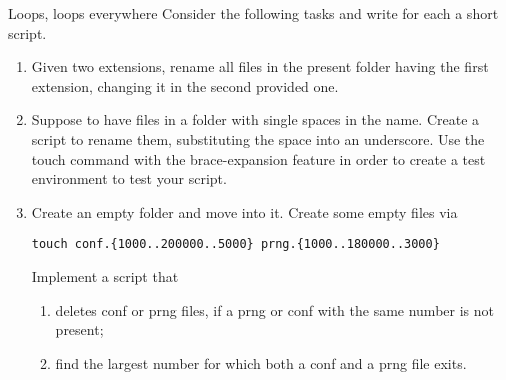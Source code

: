 
\begin{exercise}[Instructive]{Loops, loops everywhere}
    Consider the following tasks and write for each a short script.
    \begin{enumerate}[after=\vspace{-0.6\baselineskip}]
        \item Given two extensions, rename all files in the present folder having the first extension, changing it in the second provided one.
        \item Suppose to have files in a folder with single spaces in the name. Create a script to rename them, substituting the space into an underscore.
              Use the touch command with the brace-expansion feature in order to create a test environment to test your script.
        \item Create an empty folder and move into it.
              Create some empty files via
              \begin{lstlisting}[style=MyBash, numbers=none]
                  touch conf.{1000..200000..5000} prng.{1000..180000..3000}
              \end{lstlisting}
              Implement a script that
              \begin{enumerate}[after=\vspace{-0.6\baselineskip}]
                  \item deletes conf or prng files, if a prng or conf with the same number is not present;
                  \item find the largest number for which both a conf and a prng file exits.
              \end{enumerate}
    \end{enumerate}
    \bigskip
\end{exercise}
